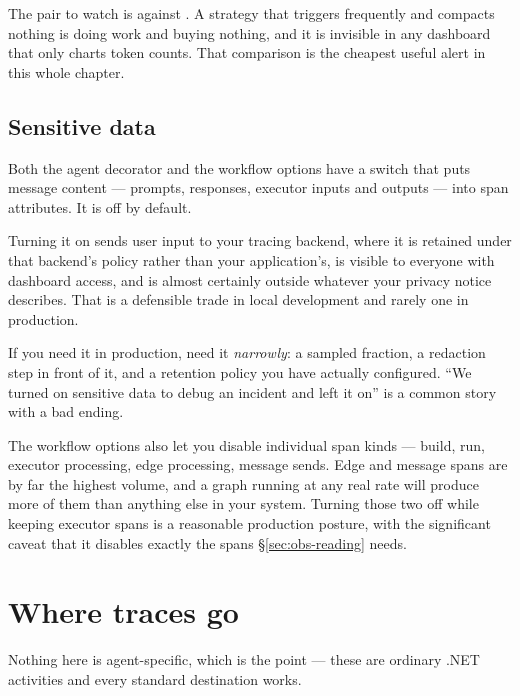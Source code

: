 \begin{note}
The pair to watch is  against . A strategy that
triggers frequently and compacts nothing is doing work and buying nothing, and it
is invisible in any dashboard that only charts token counts. That comparison is
the cheapest useful alert in this whole chapter.
\end{note}

\subsection{Sensitive data}

Both the agent decorator and the workflow options have a switch that puts message
content --- prompts, responses, executor inputs and outputs --- into span
attributes. It is off by default.

\begin{warning}
Turning it on sends user input to your tracing backend, where it is retained
under that backend's policy rather than your application's, is visible to
everyone with dashboard access, and is almost certainly outside whatever your
privacy notice describes. That is a defensible trade in local development and
rarely one in production.

If you need it in production, need it \emph{narrowly}: a sampled fraction, a
redaction step in front of it, and a retention policy you have actually
configured. ``We turned on sensitive data to debug an incident and left it on''
is a common story with a bad ending.
\end{warning}

The workflow options also let you disable individual span kinds --- build, run,
executor processing, edge processing, message sends. Edge and message spans are
by far the highest volume, and a graph running at any real rate will produce more
of them than anything else in your system. Turning those two off while keeping
executor spans is a reasonable production posture, with the significant caveat
that it disables exactly the spans \S\ref{sec:obs-reading} needs.

\section{Where traces go}
\label{sec:obs-destinations}

Nothing here is agent-specific, which is the point --- these are ordinary .NET
activities and every standard destination works.

